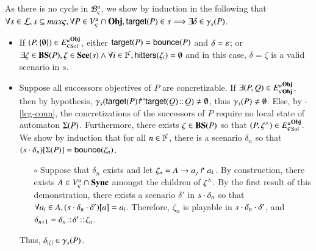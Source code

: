\begin{proofapproxinf}
As there is no cycle in ${\mathcal{B}_{\varsigma}^{u}}$, we show by induction in the following that
$\forall s\in \mathcal{L}, s\subseteq max\varsigma, \forall P \in {V_\varsigma^u} \cap \mathbf{Obj},
\mathsf{target}(P) \in s \Longrightarrow \exists \delta \in \gamma_s(P)$.
\begin{itemize}
  \item If $(P, \{ \emptyset \}) \in {E_\varsigma^u}^{\mathbf{Obj}}_{\mathrm{Sol}}$,
    either $\mathsf{target}(P) = \mathsf{bounce}(P)$ and $\delta = \varepsilon$;
    or $\exists \zeta \in \mathbf{BS}(P), \zeta \in \mathbf{Sce}(s) \wedge
      \forall i \in \mathbb{I}^{\zeta}, \mathsf{hitters}(\zeta_i) = \emptyset$
    and in this case, $\delta = \zeta$ is a valid scenario in $s$.

  \item Suppose all successors objectives of $P$ are concretizable.
    If $\exists (P, Q) \in {E_\varsigma^u}^{\mathbf{Obj}}_{\mathbf{Obj}}$, then by hypothesis,
      $\gamma_{s}({\mathsf{target}(P)\!\Rsh^*\!\!\mathsf{target}(Q)} \!::\! Q) \neq \emptyset$, thus
      $\gamma_{s}(P) \neq \emptyset$.
    Else, by -\ref{lcg-conn}, the concretizations of the successors of $P$ require no local state of automaton $\Sigma(P)$.
      Furthermore, there exists $\zeta \in \mathbf{BS}(P)$ so that $(P, \zeta^\wedge) \in {E_\varsigma^u}^{\mathbf{Obj}}_{\mathrm{Sol}}$.
      We show by induction that for all $n \in \mathbb{I}^{\zeta}$, there is a scenario $\delta_n$ so that ${(s \cdot \delta_n)[\Sigma(P)]} = \mathsf{bounce}(\zeta_n)$.
      \begin{itemize}
        \item[$\circ$] Suppose that $\delta_n$ exists and let $\zeta_n = A\rightarrow a_j\Rsh a_k$.
        By construction, there exists $A \in {V_\varsigma^u} \cap \mathbf{Sync}$
        amongst the children of $\zeta^\wedge$.
        By the first result of this demonstration,
        there exists a scenario $\delta'$ in $s \cdot \delta_n$ so that
        $\forall a_i \in A, {(s \cdot \delta_n \cdot \delta')[a]} = a_i$.
        Therefore, $\zeta_n$ is playable in $s \cdot \delta_n \cdot \delta'$,
        and $\delta_{n+1} = \delta_n \!::\! \delta' \!::\! \zeta_n$.
      \end{itemize}
      Thus, $\delta_{|\zeta|} \in \gamma_s(P)$. %
\end{itemize}
\end{proofapproxinf}
